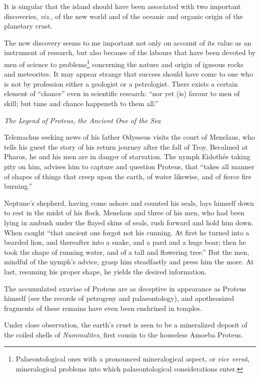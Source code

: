 \documentclass[a4paper, 12pt, oneside]{article}
\begin{document}
It is singular that the island should have been associated with two important discoveries, \emph{viz.}, of the new world and of the oceanic and organic origin of the planetary crust.

The new discovery seems to me important not only on account of its value as an instrument of research, but also because of the labours that have been devoted by men of science to problems\footnote{Palaeontological ones with a pronounced mineralogical aspect, or \emph{vice versâ}, mineralogical problems into which palaeontological considerations enter.} concerning the nature and origin of igneous rocks and meteorites. It may appear strange that success should have come to one who is not by profession either a geologist or a petrologist. There exists a certain element of ``chance'' even in scientific research: ``nor yet (is) favour to men of skill; but time and chance happeneth to them all.''

\emph{The Legend of Proteus, the Ancient One of the Sea} 

Telemachus seeking news of his father Odysseus visits the court of Menelaus, who tells his guest the story of his return journey after the fall of Troy. Becalmed at Pharos, he and his men are in danger of starvation. The nymph Eidothée taking pity on him, advises him to capture and question Proteus, that ``takes all manner of shapes of things that creep upon the earth, of water likewise, and of fierce fire burning.''

Neptune's shepherd, having come ashore and counted his seals, lays himself down to rest in the midst of his flock. Menelaus and three of his men, who had been lying in ambush under the flayed skins of seals, rush forward and hold him down. When caught ``that ancient one forgot not his cunning. At first he turned into a bearded lion, and thereafter into a snake, and a pard and a huge boar; then he took the shape of running water, and of a tall and flowering tree.'' But the men, mindful of the nymph's advice, grasp him steadfastly and press him the more. At last, resuming his proper shape, he yields the desired information.

The accumulated exuviae of Proteus are as deceptive in appearance as Proteus himself (see the records of petrogeny and palaeontology), and apotheosized fragments of these remains have even been enshrined in temples.

Under close observation, the earth's crust is seen to be a mineralized deposit of the coiled shells of \emph{Nummulites}, first cousin to the houseless Amoeba Proteus.
\end{document}
